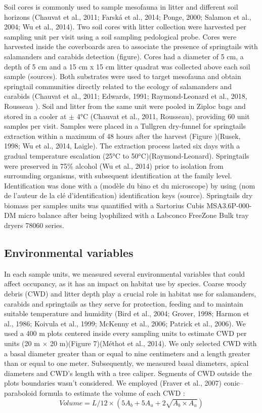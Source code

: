 Soil cores is commonly used to sample mesofauna in litter and different soil horizons (Chauvat et al., 2011; Farská et al., 2014; Ponge, 2000; Salamon et al., 2004; Wu et al., 2014). 
Two soil cores with litter collection were harvested per sampling unit per visit using a soil sampling pedological probe. 
Cores were harvested inside the coverboards area to associate the presence of springtails with salamanders and carabids detection (figure). 
Cores had a diameter of 5 cm, a depth of 5 cm and a 15 cm x 15 cm litter quadrat was collected above each soil sample (sources).
Both substrates were used to target mesofauna and obtain springtail communities directly related to the ecology of salamanders and carabids (Chauvat et al., 2011; Edwards, 1991; Raymond-Leonard et al., 2018, Rousseau ).
Soil and litter from the same unit were pooled in Ziploc bags and stored in a cooler at $\pm$ 4°C (Chauvat et al., 2011, Rousseau), providing 60 unit samples per visit.
Samples were placed in a Tullgren dry-funnel for springtails extraction within a maximum of 48 hours after the harvest (Figure )(Rusek, 1998; Wu et al., 2014, Laigle). 
The extraction process lasted six days with a gradual temperature escalation (25°C to 50°C)(Raymond-Leonard).
Springtails were preserved in 75\% alcohol (Wu et al., 2014) prior to isolation from surrounding organisms, with subsequent identification at the family level.
Identification was done with a (modèle du bino et du microscope) by using (nom de l'auteur de la clé d'identification) identification keys (source).
Springtails dry biomass per samples units was quantified with a Sartorius Cubis MSA3.6P-000-DM micro balance after being lyophilized with a Labconco FreeZone Bulk tray dryers 78060 series.



\subsection*{Environmental variables}
\label{subsec:EnvVar}

In each sample units, we measured several environmental variables that could affect occupancy, as it has an impact on habitat use by species.
Coarse woody debris (CWD) and litter depth play a crucial role in habitat use for salamanders, carabids and springtails as
they serve for protection, feeding and to maintain suitable temperature and humidity (Bird et al., 2004; Grover, 1998; Harmon et al., 1986; Koivula et al., 1999; McKenny et al., 2006; Patrick et al., 2006). 
We used a 400 m plots centered inside every sampling units to estimate CWD per units (20 m $\times$  20 m)(Figure 7)(Méthot et al., 2014). 
We only selected CWD with a basal diameter greater than or equal to nine centimeters and a length greater than or equal to one meter.
Subsequently, we measured basal diameters, apical diameters and CWD's length with a tree caliper. 
Segments of CWD outside the plots boundaries wasn't considered.
We employed (Fraver et al., 2007) conic–paraboloid formula to estimate the volume of each CWD :
\[Volume = L/12 \times (5A_b + 5A_u + 2\sqrt{A_b \times A_u})\]

